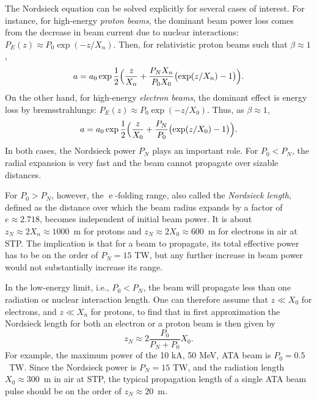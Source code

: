 \documentclass [12pt,a4paper,     ]{report} %
\newcommand{\e  }{\operatorname{e}}   %
\begin{document}
  The Nordsieck equation can be solved explicitly for several cases of interest.  For instance, for high-energy \emph{proton beams}, the dominant beam power loss comes from the decrease in beam current due to nuclear interactions: $P_E(z) \approx P_0 \exp(-z/X_n)$.  Then, for relativistic proton beams such that $\beta\approx 1$, 
%
\begin{equation}\label{nor:10} %
    a = a_0 \exp  \frac{1}{2}\Bigl( \frac{z}{X_n}
                 + \frac{P_NX_n}{P_0X_0} \bigl(\exp(z/X_n)-1\bigr) \Bigr).
\end{equation}
%
On the other hand, for high-energy \emph{electron beams}, the dominant effect is energy loss by bremsstrahlungs: $P_E(z) \approx P_0 \exp(-z/X_0)$.  Thus, as $\beta\approx 1$, 
%
\begin{equation}\label{nor:11} %
    a = a_0 \exp  \frac{1}{2}\Bigl( \frac{z}{X_0}
                 + \frac{P_N}{P_0} \bigl(\exp(z/X_0)-1\bigr) \Bigr).
\end{equation}
%
In both cases, the Nordsieck power $P_N$ plays an important role.  For $P_0 < P_N$, the radial expansion is very fast and the beam cannot propagate over sizable distances.

For $P_0 > P_N$, however, the $\e$-folding range, also called the \emph{Nordsieck length}, defined as the distance over which the beam radius expands by a factor of $e \approx 2.718$, becomes independent of initial beam power.  It is about $z_N \approx 2X_n \approx 1000$~m for protons and $z_N \approx 2X_0 \approx 600$~m for electrons in air at STP.  The implication is that for a beam to propagate, its total effective power has to be on the order of $P_N = 15$ TW, but any further increase in beam power would not substantially increase its range.

In the low-energy limit, i.e., $P_0 < P_N$, the beam will propagate less than one radiation or nuclear interaction length.  One can therefore assume that $z\ll X_0$ for electrons, and $z\ll X_n$ for protons, to find that in first approximation the {Nordsieck length} for both an electron or a proton beam is then given by
%
\begin{equation}\label{nor:12} %
    z_N \approx 2 \frac{P_0}{P_N+P_0} X_0.
\end{equation}
%
For example, the maximum power of the 10 kA, 50 MeV, ATA beam is $P_0 = 0.5$~TW.  Since the Nordsieck power is $P_N = 15$ TW, and the radiation length $X_0 \approx 300$~m in air at STP, the typical propagation length of a single ATA beam pulse should be on the order of $z_N \approx 20$~m.
\end{document}

